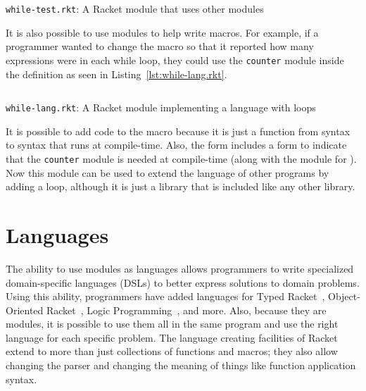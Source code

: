\begin{listing}[tb]
  \inputminted{racket}{listings/while-test.rkt}
  \caption{\texttt{while-test.rkt}: A Racket module that uses other modules}
  \label{lst:while-test.rkt}
\end{listing}

It is also possible to use modules to help write macros.
For example, if a programmer wanted to change the  macro so that it reported how many expressions were in each while loop, they could use the \texttt{counter} module inside the  definition as seen in Listing~\ref{lst:while-lang.rkt}.
\begin{listing}[tb]
  \inputminted{racket}{listings/while-lang.rkt}
  \caption{\texttt{while-lang.rkt}: A Racket module implementing a language with  loops}
  \label{lst:while-lang.rkt}
\end{listing}
It is possible to add code to the  macro because it is just a function from syntax to syntax that runs at compile-time. 
Also, the  form includes a  form to indicate that the \texttt{counter} module is needed at compile-time (along with the  module for ).
Now this module can be used to extend the language of other programs by adding a  loop, although it is just a library that is included like any other library.

\section{Languages}
The ability to use modules as languages allows programmers to write specialized domain-specific languages (DSLs) to better express solutions to domain problems. 
Using this ability, programmers have added languages for Typed Racket~\cite{typed}, Object-Oriented Racket~\cite{oo}, Logic Programming~\cite{logic}, and more.
Also, because they are modules, it is possible to use them all in the same program and use the right language for each specific problem.
The language creating facilities of Racket extend to more than just collections of functions and macros; they also allow changing the parser and changing the meaning of things like function application syntax. 

